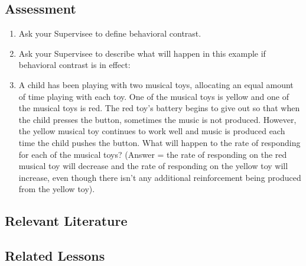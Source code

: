 \subsection{Assessment}
\begin{enumerate}
\item Ask your Supervisee to define behavioral contrast.
\item Ask your Supervisee to describe what will happen in this example if behavioral contrast is in effect: 
\item A child has been playing with two musical toys, allocating an equal amount of time playing with each toy. One of the musical toys is yellow and one of the musical toys is red. The red toy's battery begins to give out so that when the child presses the button, sometimes the music is not produced. However, the yellow musical toy continues to work well and music is produced each time the child pushes the button. What will happen to the rate of responding for each of the musical toys? (Answer = the rate of responding on the red musical toy will decrease and the rate of responding on the yellow toy will increase, even though there isn't any additional reinforcement being produced from the yellow toy).
\end{enumerate}
%
\subsection{Relevant Literature}
\begin{refsection}
\nocite{cooper2007applied,
        fagen1978behavioral,
        hantula1994behavioral,
        mcsweeney1998habituation,
        reynolds1961behavioral,
        reynolds1963some,
        tarbox2005verbal,
        weatherly1996picking,
        weatherly2002rats}
\printbibliography[heading=none]
\end{refsection}
%
\subsection{Related Lessons}
\fourcTwo{}\\
\fourdFifteen{}\\
\fourdSixteen{}\\
\fourdSeventeen{}\\
\fourdNineteen{}\\
\fourjTen{}\\
\fourkTwo{}\\
\fourFKThirtyEight{}\\
\fourFKFourty{}\\
%

